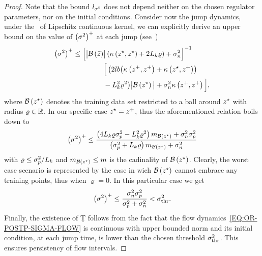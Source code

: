 \begin{proof}
   Note that the bound $l_{\sigma^2}$ does not depend neither on the chosen regulator parameters, nor on the initial conditions.
   Consider now the jump dynamics, under the~ of Lipschitz continuous kernel, we can explicitly derive an upper bound on
   the value of $\left( \sigma^2 \right)^+$ at each jump (see~\cite[Theorem 1]{lederer2021uniform})
   \begin{equation*}
    	\begin{split}
			\left( \sigma^2\right)^+ \le \Big[ \big| \mathcal{B} \left( \bar{z} \right) & \big| \left( \kappa \left( z^{\star}, z^{\star} \right) + 2L_{k} \varrho \right) + \sigma_n^2 \Big]^{-1} \\
			& \Big[ \left( 2lb \big( \kappa\left(z^+, z^+ \right) + \kappa \left( z^{\star}, z^+ \right)\right) \\ 
			& - L_{k}^2 \varrho^2\big) \big|\mathcal{B}\left(z^{\star}\right)\big| + \sigma_n^2 \kappa\left(z^+, z^+\right)\Big],
    	\end{split}
   \end{equation*}
   where $\mathcal{B} \left( z^{\star} \right)$ denotes the training data set restricted to a ball around $z^{\star}$ with radius $\varrho \in \mathbb{R}$.
   In our specific case $z^{\star} = z^+$, thus the aforementioned relation boils down to
   \begin{equation*}
		\left( \sigma^2\right)^+ \le \frac{\left( 4L_k \varrho \sigma_p^2 - L_k^2 \varrho^2\right) m_{\mathcal{B} \left( z^{\star} \right)} + \sigma_n^2 \sigma_p^2}{\left( \sigma_p^2 + L_k \varrho\right) m_{\mathcal{B} \left( z^{\star} \right)} + \sigma_n^2}
   \end{equation*}
   with $\varrho \le \sigma_p^2 / L_k$ and $m_{\mathcal{B}\left(z^{\star}\right)} \le m$ is the cadinality of $\mathcal{B}\left(z^{\star}\right)$.
   Clearly, the worst case scenario is represented by the case in wich $\mathcal{B}\left(z^{\star}\right)$ cannot embrace any training points, thus when $\varrho = 0$.
   In this particular case we get
   \begin{equation*}
      \left( \sigma^2\right)^+ \le \frac{\sigma_n^2 \sigma_p^2}{\sigma_p^2 + \sigma_n^2} < \sigma^2_{\text{thr}}.
   \end{equation*}
   Finally, the existence of $\underline{\text{T}}$ follows from the fact that the flow dynamics~\eqref{EQ:OR-POSTP-SIGMA-FLOW} is continuous
   with upper bounded norm and its initial condition, at each jump time, is lower than the chosen threshold $\sigma^2_{\text{thr}}$.
   This ensures persistency of flow intervals.
\end{proof}
